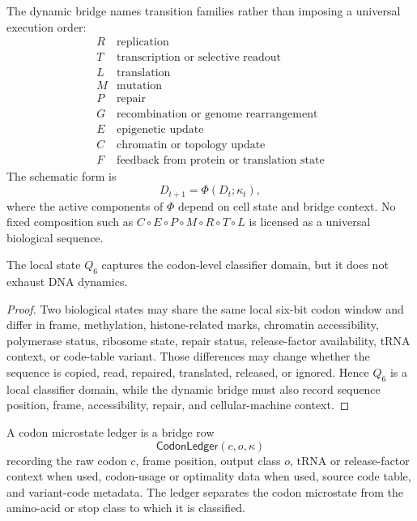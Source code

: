 \begin{definition}
\label{def:philosophy-dna-transition-families}
The dynamic bridge names transition families rather than imposing a
universal execution order:
$$
\begin{array}{c|l}
  R & \text{replication}\\
  T & \text{transcription or selective readout}\\
  L & \text{translation}\\
  M & \text{mutation}\\
  P & \text{repair}\\
  G & \text{recombination or genome rearrangement}\\
  E & \text{epigenetic update}\\
  C & \text{chromatin or topology update}\\
  F & \text{feedback from protein or translation state}
\end{array}
$$
The schematic form is
$$
  D_{t+1}=\Phi(D_{t};\kappa_{t}),
$$
where the active components of $\Phi$ depend on cell state and bridge
context. No fixed composition such as
$C\circ E\circ P\circ M\circ R\circ T\circ L$ is licensed as a universal
biological sequence.
\end{definition}

\begin{theorem}
\label{thm:philosophy-window-six-local-incomplete}
The local state $Q_{6}$ captures the codon-level classifier domain, but
it does not exhaust DNA dynamics.
\end{theorem}
\begin{proof}
Two biological states may share the same local six-bit codon window and
differ in frame, methylation, histone-related marks, chromatin
accessibility, polymerase status, ribosome state, repair status,
release-factor availability, tRNA context, or code-table variant. Those
differences may change whether the sequence is copied, read, repaired,
translated, released, or ignored. Hence $Q_{6}$ is a local classifier
domain, while the dynamic bridge must also record sequence position,
frame, accessibility, repair, and cellular-machine context.
\end{proof}

\begin{definition}
\label{def:philosophy-codon-microstate-ledger}
A codon microstate ledger is a bridge row
$$
  \mathsf{CodonLedger}(c,o,\kappa)
$$
recording the raw codon $c$, frame position, output class $o$, tRNA or
release-factor context when used, codon-usage or optimality data when
used, source code table, and variant-code metadata. The ledger separates
the codon microstate from the amino-acid or stop class to which it is
classified.
\end{definition}


